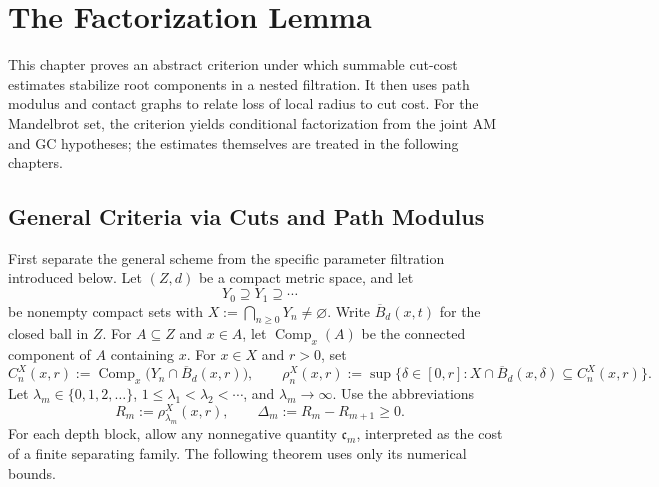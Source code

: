 \chapter{The Factorization Lemma}
\noindent This chapter proves an abstract criterion under which summable cut-cost estimates stabilize root components in a nested filtration. It then uses path modulus and contact graphs to relate loss of local radius to cut cost. For the Mandelbrot set, the criterion yields conditional factorization from the joint AM and GC hypotheses; the estimates themselves are treated in the following chapters.

\section{General Criteria via Cuts and Path Modulus}
\label{sec:general-cut-theorems}

First separate the general scheme from the specific parameter
filtration introduced below. Let \((Z,d)\) be a compact metric space,
and let
\[
 Y_0\supseteq Y_1\supseteq\cdots
\]
be nonempty compact sets with \(X:=\bigcap_{n\ge0}Y_n\ne\varnothing\).
Write \(\overline B_d(x,t)\) for the closed ball in \(Z\). For
\(A\subseteq Z\) and \(x\in A\), let \(\operatorname{Comp}_x(A)\) be
the connected component of \(A\) containing \(x\). For \(x\in X\) and
\(r>0\), set
\[
 C_n^X(x,r):=
 \operatorname{Comp}_x\bigl(Y_n\cap\overline B_d(x,r)\bigr),\qquad
 \rho_n^X(x,r):=
 \sup\{\delta\in[0,r]:
 X\cap\overline B_d(x,\delta)\subseteq C_n^X(x,r)\}.
\]
Let \(\lambda_m\in\{0,1,2,\ldots\}\),
\(1\le\lambda_1<\lambda_2<\cdots\), and
\(\lambda_m\to\infty\). Use the abbreviations
\[
 R_m:=\rho_{\lambda_m}^X(x,r),\qquad
 \Delta_m:=R_m-R_{m+1}\ge0.
\]
For each depth block, allow any nonnegative quantity
\(\mathfrak c_m\), interpreted as the cost of a finite separating
family. The following theorem uses only its numerical bounds.

